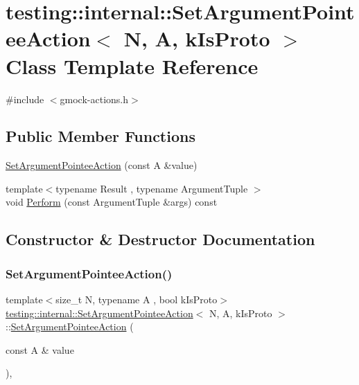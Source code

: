\hypertarget{classtesting_1_1internal_1_1SetArgumentPointeeAction}{}\section{testing\+::internal\+::Set\+Argument\+Pointee\+Action$<$ N, A, k\+Is\+Proto $>$ Class Template Reference}
\label{classtesting_1_1internal_1_1SetArgumentPointeeAction}


{\ttfamily \#include $<$gmock-\/actions.\+h$>$}

\subsection*{Public Member Functions}
\begin{DoxyCompactItemize}
\item 
\mbox{\hyperlink{classtesting_1_1internal_1_1SetArgumentPointeeAction_a5a4119ed113667bd4a003ab0bec2cdff}{Set\+Argument\+Pointee\+Action}} (const A \&value)
\item 
{\footnotesize template$<$typename Result , typename Argument\+Tuple $>$ }\\void \mbox{\hyperlink{classtesting_1_1internal_1_1SetArgumentPointeeAction_a128320dcf991ff7f1a0087dab38b4014}{Perform}} (const Argument\+Tuple \&args) const
\end{DoxyCompactItemize}


\subsection{Constructor \& Destructor Documentation}
\mbox{\label{classtesting_1_1internal_1_1SetArgumentPointeeAction_a5a4119ed113667bd4a003ab0bec2cdff}} 
\subsubsection{\texorpdfstring{SetArgumentPointeeAction()}{SetArgumentPointeeAction()}}
{\footnotesize\ttfamily template$<$size\+\_\+t N, typename A , bool k\+Is\+Proto$>$ \\
\mbox{\hyperlink{classtesting_1_1internal_1_1SetArgumentPointeeAction}{testing\+::internal\+::\+Set\+Argument\+Pointee\+Action}}$<$ N, A, k\+Is\+Proto $>$\+::\mbox{\hyperlink{classtesting_1_1internal_1_1SetArgumentPointeeAction}{Set\+Argument\+Pointee\+Action}} (\begin{DoxyParamCaption}\item[{const A \&}]{value }\end{DoxyParamCaption})\hspace{0.3cm}{\ttfamily [inline]}, {\ttfamily [explicit]}}



